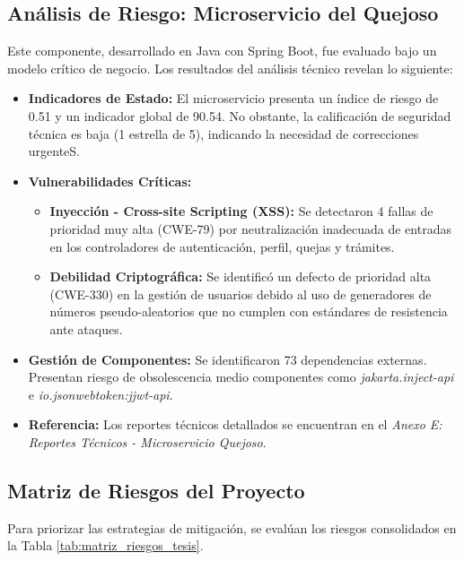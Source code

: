 \subsection{Análisis de Riesgo: Microservicio del Quejoso}
Este componente, desarrollado en Java con Spring Boot, fue evaluado bajo un modelo crítico de negocio. Los resultados del análisis técnico revelan lo siguiente:

\begin{itemize}
    \item \textbf{Indicadores de Estado:} El microservicio presenta un índice de riesgo de 0.51 y un indicador global de 90.54. No obstante, la calificación de seguridad técnica es baja (1 estrella de 5), indicando la necesidad de correcciones urgenteS.
    \item \textbf{Vulnerabilidades Críticas:}
    \begin{itemize}
        \item \textbf{Inyección - Cross-site Scripting (XSS):} Se detectaron 4 fallas de prioridad muy alta (CWE-79) por neutralización inadecuada de entradas en los controladores de autenticación, perfil, quejas y trámites.
        \item \textbf{Debilidad Criptográfica:} Se identificó un defecto de prioridad alta (CWE-330) en la gestión de usuarios debido al uso de generadores de números pseudo-aleatorios que no cumplen con estándares de resistencia ante ataques.
    \end{itemize}
    \item \textbf{Gestión de Componentes:} Se identificaron 73 dependencias externas. Presentan riesgo de obsolescencia medio componentes como \textit{jakarta.inject-api} e \textit{io.jsonwebtoken:jjwt-api}.
    \item \textbf{Referencia:} Los reportes técnicos detallados se encuentran en el \textit{Anexo E: Reportes Técnicos - Microservicio Quejoso}.
\end{itemize}

\subsection{Matriz de Riesgos del Proyecto}
Para priorizar las estrategias de mitigación, se evalúan los riesgos consolidados en la Tabla \ref{tab:matriz_riesgos_tesis}.

